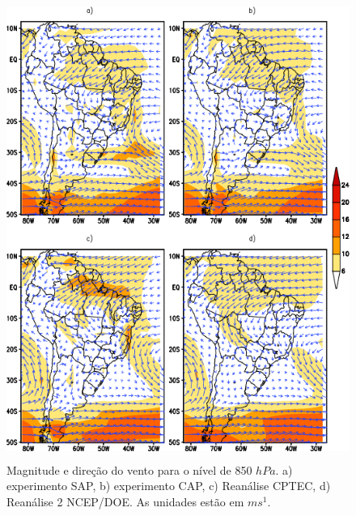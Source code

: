 \begin{figure}[!hbp]
\centering
\includegraphics[height=15cm]{./figs/media_ventos_anl_850hPa.png}
\caption{Magnitude e direção do vento para o nível de 850 $hPa$. a) experimento SAP, b) experimento CAP, c) Reanálise CPTEC, d) Reanálise 2 NCEP/DOE. As unidades estão em $ms^{1}$.}
\label{fig17}
\end{figure}

